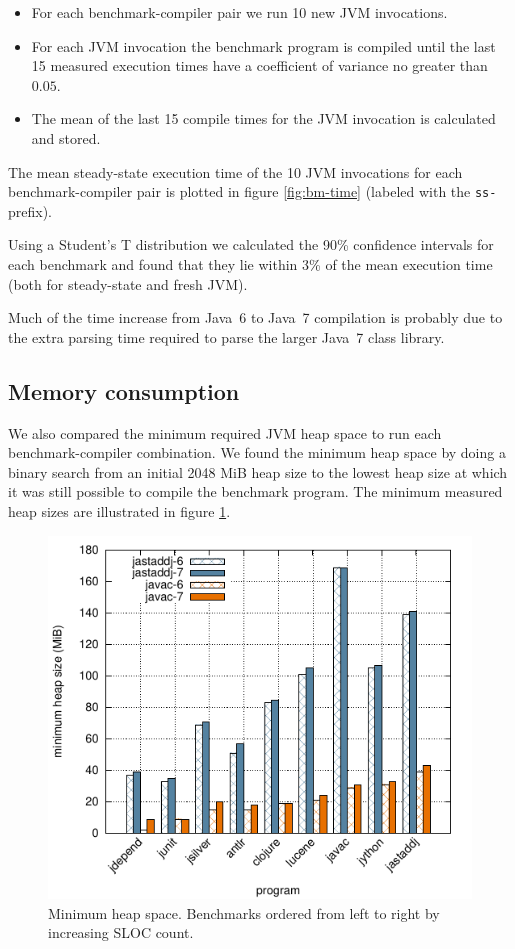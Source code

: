 {\begin{itemize}
	\item For each benchmark-compiler pair we run 10 new JVM invocations.

	\item For each JVM invocation the benchmark program is compiled until the
		last 15 measured execution times have a coefficient of variance no
		greater than $0.05$.

	\item The mean of the last 15 compile times for the JVM invocation is
		calculated and stored.

\end{itemize}

The mean steady-state execution time of the 10 JVM invocations for each
benchmark-compiler pair is plotted in figure \ref{fig:bm-time} (labeled with
the \verb'ss-' prefix).

Using a Student's T distribution we calculated the 90\% confidence intervals
for each benchmark and found that they lie within 3\% of the mean execution
time (both for steady-state and fresh JVM).

Much of the time increase from Java~6 to Java~7 compilation is probably due
to the extra parsing time required to parse the larger Java~7 class library.

\subsection{Memory consumption}

We also compared the minimum required JVM heap space to run each
benchmark-compiler combination.  We found the minimum heap space by
doing a binary search from an initial 2048 MiB heap size to the lowest
heap size at which it was still possible to compile the benchmark program.
The minimum measured heap sizes are illustrated in figure \ref{fig:bm-mem}.

\begin{figure}
	\includegraphics[width=\textwidth]{figures/bm-mem}
	\caption{Minimum heap space. Benchmarks ordered from left to right by
	increasing SLOC count.}
	\label{fig:bm-mem}
\end{figure}

}
